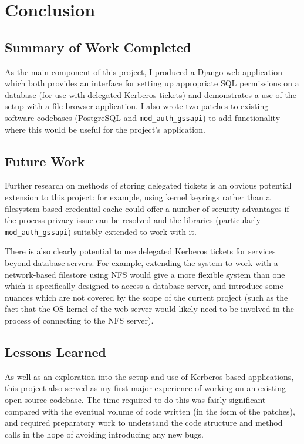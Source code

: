 \documentclass[12pt]{report}
\begin{document}
\chapter{Conclusion}
\section{Summary of Work Completed}
As the main component of this project, I produced a Django web application which both provides an interface for setting up appropriate SQL permissions on a database (for use with delegated Kerberos tickets) and demonstrates a use of the setup with a file browser application. I also wrote two patches to existing software codebases (PostgreSQL and \verb+mod_auth_gssapi+) to add functionality where this would be useful for the project's application.

\section{Future Work}
Further research on methods of storing delegated tickets is an obvious potential extension to this project: for example, using kernel keyrings rather than a filesystem-based credential cache could offer a number of security advantages if the process-privacy issue can be resolved and the libraries (particularly \verb+mod_auth_gssapi+) suitably extended to work with it.

There is also clearly potential to use delegated Kerberos tickets for services beyond database servers. For example, extending the system to work with a network-based filestore using NFS would give a more flexible system than one which is specifically designed to access a database server, and introduce some nuances which are not covered by the scope of the current project (such as the fact that the OS kernel of the web server would likely need to be involved in the process of connecting to the NFS server).

\section{Lessons Learned}
As well as an exploration into the setup and use of Kerberos-based applications, this project also served as my first major experience of working on an existing open-source codebase. The time required to do this was fairly significant compared with the eventual volume of code written (in the form of the patches), and required preparatory work to understand the code structure and method calls in the hope of avoiding introducing any new bugs.
\end{document}
